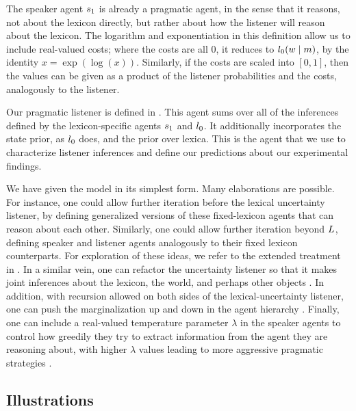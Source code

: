 \documentclass[leqno]{article}
\begin{document}
The speaker agent $s_{1}$ is already a pragmatic agent, in the
sense that it reasons, not about the lexicon directly, but rather
about how the listener will reason about the lexicon. The logarithm
and exponentiation in this definition allow us to include real-valued
costs; where the costs are all $0$, it reduces to
$l_{0}(w \mid m)$, by the identity $x =
\exp(\log(x))$.  Similarly, if the costs are scaled into $[0,1]$, then
the values can be given as a product of the listener probabilities and
the costs, analogously to the listener.

Our pragmatic listener is defined in . This agent
sums over all of the inferences defined by the lexicon-specific agents
$s_{1}$ and $l_{0}$. It additionally incorporates the
state prior, as $l_{0}$ does, and the prior over lexica.  This
is the agent that we use to characterize listener inferences and
define our predictions about our experimental findings.

We have given the model in its simplest form. Many elaborations are
possible. For instance, one could allow further iteration before the
lexical uncertainty listener, by defining generalized versions of
these fixed-lexicon agents that can reason about each
other. Similarly, one could allow further iteration beyond
$L$, defining speaker and listener agents
analogously to their fixed lexicon counterparts.  For exploration of
these ideas, we refer to the extended treatment in
\citealt{Bergen:Levy:Goodman:2014}. In a similar vein, one can
refactor the uncertainty listener so that it makes joint inferences
about the lexicon, the world, and perhaps other objects
\citep{Smith:Goodman:Frank:2013, Kao-etal:2014}. In addition, with
recursion allowed on both sides of the lexical-uncertainty listener,
one can push the marginalization up and down in the agent hierarchy
\citep{Goodman:Lassiter:2013}. Finally, one can include a real-valued
temperature parameter $\lambda$ in the speaker agents to control how
greedily they try to extract information from the agent they are
reasoning about, with higher $\lambda$ values leading to more
aggressive pragmatic strategies
\citep{Sutton:Barto:1998,Bergen:Levy:Goodman:2014}.


\subsection{Illustrations}\label{sec:illustrations}
\end{document}
